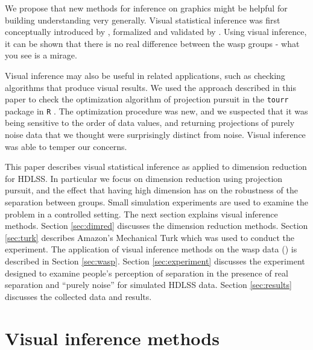 We propose that new methods for inference on graphics might be helpful for building understanding very generally. Visual statistical inference was first conceptually introduced by \cite{buja:2009}, formalized and validated by \cite{majumder:2013}. Using visual inference, it can be shown that there is no real difference between the wasp groups - what you see is a mirage. 

Visual inference may also be useful in related applications, such as checking algorithms that produce visual results. We used the approach described in this paper to check the optimization algorithm of projection pursuit in the \texttt{tourr} package \citep{tourr:2011} in \texttt{R} \citep{r}. The optimization procedure was new, and we suspected that it was being sensitive to the order of data values, and returning projections of purely noise data that we thought were surprisingly distinct from noise. Visual inference was able to temper our concerns.   

This paper describes visual statistical inference as applied to dimension reduction for HDLSS. In particular we focus on dimension reduction using projection pursuit, and the effect that having high dimension has on the robustness of the separation between groups.  Small simulation experiments are used to examine the problem in a controlled setting. The next section explains visual inference methods. Section \ref{sec:dimred} discusses the dimension reduction methods. Section \ref{sec:turk} describes Amazon's Mechanical Turk  \citep{turk}  which was used to conduct the experiment. The application of visual inference methods on the wasp data (\cite{toth:2010}) is described in Section \ref{sec:wasp}. Section \ref{sec:experiment} discusses the experiment designed to examine people's perception of separation in the presence of real separation and ``purely noise'' for simulated HDLSS data. Section \ref{sec:results} discusses the collected data and results. 


\section{Visual inference methods} \label{sec:inference}

